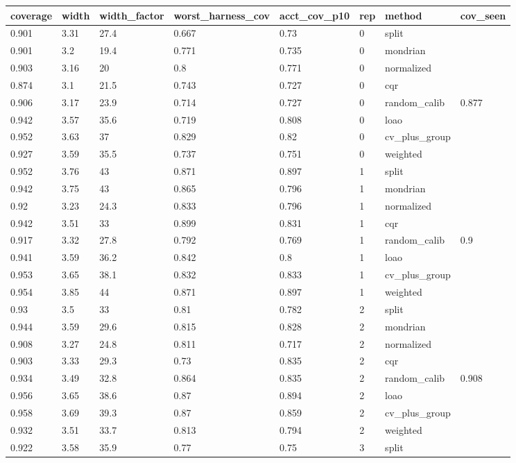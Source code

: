 \begin{tabular}{llllllll}
\toprule
coverage & width & width\_factor & worst\_harness\_cov & acct\_cov\_p10 & rep & method & cov\_seen \\
\midrule
0.901 & 3.31 & 27.4 & 0.667 & 0.73 & 0 & split &  \\
0.901 & 3.2 & 19.4 & 0.771 & 0.735 & 0 & mondrian &  \\
0.903 & 3.16 & 20 & 0.8 & 0.771 & 0 & normalized &  \\
0.874 & 3.1 & 21.5 & 0.743 & 0.727 & 0 & cqr &  \\
0.906 & 3.17 & 23.9 & 0.714 & 0.727 & 0 & random\_calib & 0.877 \\
0.942 & 3.57 & 35.6 & 0.719 & 0.808 & 0 & loao &  \\
0.952 & 3.63 & 37 & 0.829 & 0.82 & 0 & cv\_plus\_group &  \\
0.927 & 3.59 & 35.5 & 0.737 & 0.751 & 0 & weighted &  \\
0.952 & 3.76 & 43 & 0.871 & 0.897 & 1 & split &  \\
0.942 & 3.75 & 43 & 0.865 & 0.796 & 1 & mondrian &  \\
0.92 & 3.23 & 24.3 & 0.833 & 0.796 & 1 & normalized &  \\
0.942 & 3.51 & 33 & 0.899 & 0.831 & 1 & cqr &  \\
0.917 & 3.32 & 27.8 & 0.792 & 0.769 & 1 & random\_calib & 0.9 \\
0.941 & 3.59 & 36.2 & 0.842 & 0.8 & 1 & loao &  \\
0.953 & 3.65 & 38.1 & 0.832 & 0.833 & 1 & cv\_plus\_group &  \\
0.954 & 3.85 & 44 & 0.871 & 0.897 & 1 & weighted &  \\
0.93 & 3.5 & 33 & 0.81 & 0.782 & 2 & split &  \\
0.944 & 3.59 & 29.6 & 0.815 & 0.828 & 2 & mondrian &  \\
0.908 & 3.27 & 24.8 & 0.811 & 0.717 & 2 & normalized &  \\
0.903 & 3.33 & 29.3 & 0.73 & 0.835 & 2 & cqr &  \\
0.934 & 3.49 & 32.8 & 0.864 & 0.835 & 2 & random\_calib & 0.908 \\
0.956 & 3.65 & 38.6 & 0.87 & 0.894 & 2 & loao &  \\
0.958 & 3.69 & 39.3 & 0.87 & 0.859 & 2 & cv\_plus\_group &  \\
0.932 & 3.51 & 33.7 & 0.813 & 0.794 & 2 & weighted &  \\
0.922 & 3.58 & 35.9 & 0.77 & 0.75 & 3 & split &  \\

\end{tabular}
